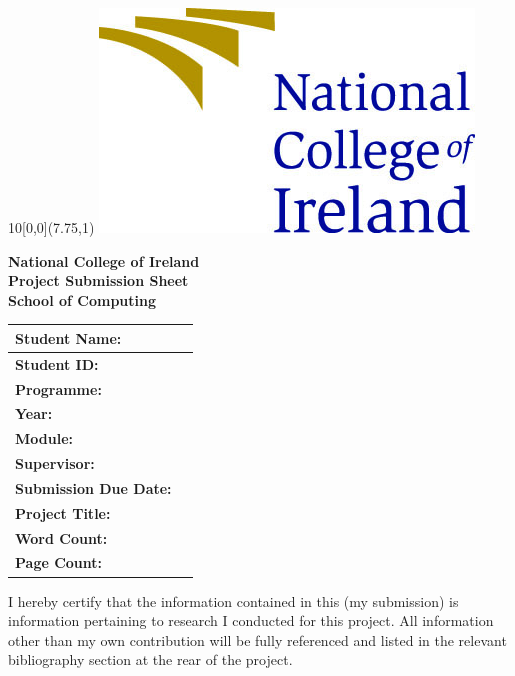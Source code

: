 
\pagestyle{empty}

	\begin{textblock}{10}[0,0](7.75,1)
		\includegraphics[width=.3\textwidth, center]{logos/NCI_Logo_colour.jpg}
	\end{textblock}

\begin{center}
\textbf{National College of Ireland}\\

\textbf{Project Submission Sheet}\\

\textbf{School of Computing}
\end{center}


\begin{table}[!h]
\begin{center}
\small
\begin{tabular}{||p{}|p{}||}
	\hline
	\textbf{Student Name:}        & \myname            \\ \hline
	\textbf{Student ID:}          & \studentID               \\ \hline
	\textbf{Programme:}           & \mystream          \\ \hline
	\textbf{Year:}                & \myyear            \\ \hline
	\textbf{Module:}              & \mytype            \\ \hline
	\textbf{Supervisor:}          & \supervisor        \\ \hline
	\textbf{Submission Due Date:} & \duedate           \\ \hline
	\textbf{Project Title:}       & \mytitle           \\ \hline
	\textbf{Word Count:}          & \wordcount         \\ \hline
	\textbf{Page Count:}          & \pageref{LastPage} \\ \hline
\end{tabular}
\end{center}
\end{table}
\vspace{-.5cm}

I hereby certify that the information contained in this (my submission) is information pertaining to research I conducted for this project. All information other than my own contribution will be fully referenced and listed in the relevant bibliography section at the rear of the project.

